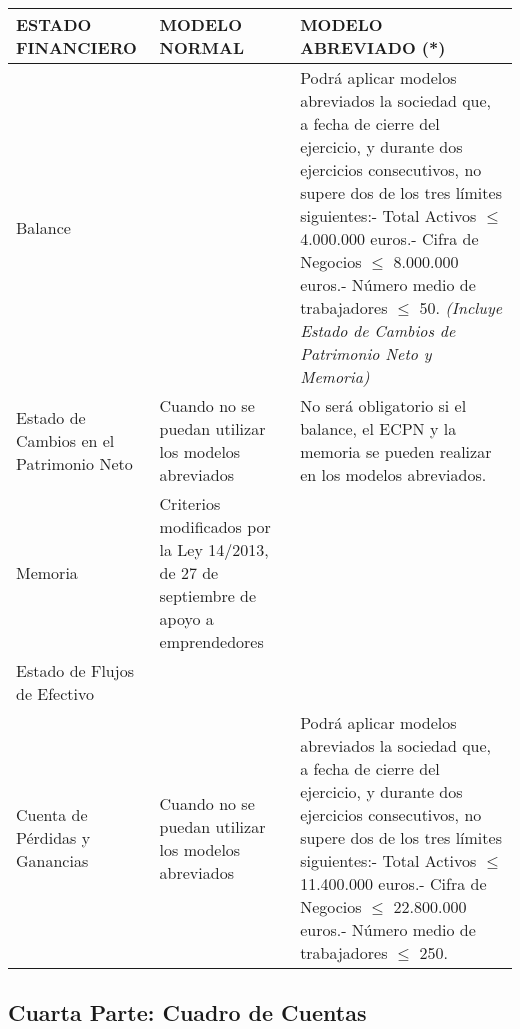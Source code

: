 \documentclass[a4paper,12pt]{article}
\begin{document}
\begin{table}[H]
    \centering
    \begin{tabular}{|p{5cm}|p{5cm}|p{5cm}|}
    \hline
    \textbf{ESTADO FINANCIERO} & \textbf{MODELO NORMAL} & \textbf{MODELO ABREVIADO (*)} \\ \hline
    Balance & & Podrá aplicar modelos abreviados la sociedad que, a fecha de cierre del ejercicio, y durante dos ejercicios consecutivos, no supere dos de los tres límites siguientes:\newline - Total Activos \(\leq\) 4.000.000 euros.\newline - Cifra de Negocios \(\leq\) 8.000.000 euros.\newline - Número medio de trabajadores \(\leq\) 50. \textit{(Incluye Estado de Cambios de Patrimonio Neto y Memoria)}\\ \hline
    Estado de Cambios en el Patrimonio Neto & Cuando no se puedan utilizar los modelos abreviados & No será obligatorio si el balance, el ECPN y la memoria se pueden realizar en los modelos abreviados. \\ \hline
    Memoria & Criterios modificados por la Ley 14/2013, de 27 de septiembre de apoyo a emprendedores & \\ \hline
    Estado de Flujos de Efectivo & & \\ \hline
    Cuenta de Pérdidas y Ganancias & Cuando no se puedan utilizar los modelos abreviados & Podrá aplicar modelos abreviados la sociedad que, a fecha de cierre del ejercicio, y durante dos ejercicios consecutivos, no supere dos de los tres límites siguientes:\newline - Total Activos \(\leq\) 11.400.000 euros.\newline - Cifra de Negocios \(\leq\) 22.800.000 euros.\newline - Número medio de trabajadores \(\leq\) 250. \\ \hline
    \end{tabular}
\end{table}

\subsection{Cuarta Parte: Cuadro de Cuentas}
\end{document}

